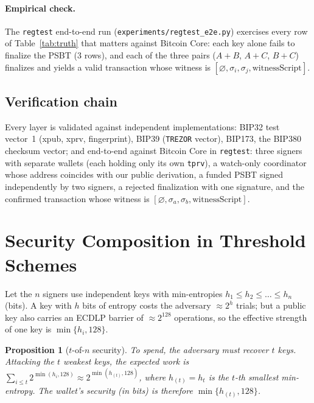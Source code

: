\documentclass[11pt,a4paper]{article}
\theoremstyle{plain}
\newtheorem{proposition}[theorem]{Proposition}
\theoremstyle{definition}
\begin{document}
\paragraph{Empirical check.} The \texttt{regtest} end-to-end run
(\texttt{experiments/regtest\_e2e.py}) exercises every row of
Table~\ref{tab:truth} that matters against Bitcoin Core: each key alone fails to
finalize the PSBT ($3$ rows), and each of the three pairs
($A{+}B$, $A{+}C$, $B{+}C$) finalizes and yields a valid transaction whose
witness is $[\varnothing,\sigma_i,\sigma_j,\text{witnessScript}]$.

\subsection{Verification chain}

Every layer is validated against independent implementations: BIP32 test
vector~1 (xpub, xprv, fingerprint), BIP39 (\texttt{TREZOR} vector), BIP173, the
BIP380 checksum vector; and end-to-end against Bitcoin Core in \texttt{regtest}:
three signers with separate wallets (each holding only its own \texttt{tprv}),
a watch-only coordinator whose address coincides with our public derivation,
a funded PSBT signed independently by two signers, a rejected finalization with
one signature, and the confirmed transaction whose witness is
$[\varnothing,\sigma_a,\sigma_b,\text{witnessScript}]$.

\section{Security Composition in Threshold Schemes}\label{sec:threshold-security}

Let the $n$ signers use independent keys with min-entropies
$h_1\le h_2\le\dots\le h_n$ (bits). A key with $h$ bits of entropy costs the
adversary $\approx2^{h}$ trials; but a public key also carries an ECDLP
barrier of $\approx2^{128}$ operations, so the effective strength of one key is
$\min\{h_i,128\}$.

\begin{proposition}[$t$-of-$n$ security]\label{prop:tofn}
To spend, the adversary must recover $t$ keys. Attacking the $t$ weakest keys,
the expected work is $\sum_{i\le t}2^{\min(h_i,128)}\approx2^{\min(h_{(t)},128)}$,
where $h_{(t)}=h_t$ is the $t$-th smallest min-entropy. The wallet's security
(in bits) is therefore $\min\{h_{(t)},128\}$.
\end{proposition}
\end{document}
